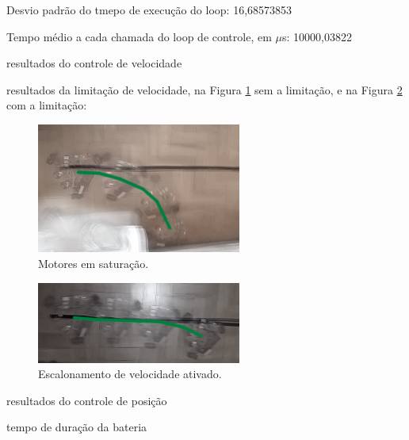 Desvio padrão do tmepo de execução do loop: 16,68573853

Tempo médio a cada chamada do loop de controle, em $\mu$s: 10000,03822

resultados do controle de velocidade

resultados da limitação de velocidade, na Figura \ref{fig:scaling_off} sem a limitação, e na Figura \ref{fig:scaling_on} com a limitação:

\begin{figure}[h]
  \centering
  \includegraphics[width = 0.6\textwidth]{imagens/scaling_off}
  \caption{Motores em saturação.}
  \label{fig:scaling_off}
\end{figure}

\begin{figure}[h]
  \centering
  \includegraphics[width = 0.6\textwidth]{imagens/scaling_on}
  \caption{Escalonamento de velocidade ativado.}
  \label{fig:scaling_on}
\end{figure}

resultados do controle de posição

tempo de duração da bateria
